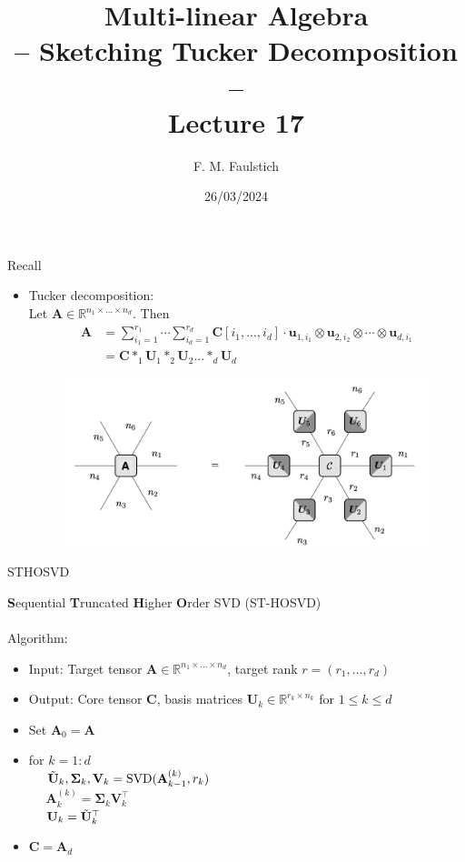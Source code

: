 \documentclass{beamer}
\title{
Multi-linear Algebra\\
-- Sketching Tucker Decomposition --\\
Lecture 17
}
\author{F. M. Faulstich}
\date{26/03/2024}
\newcommand{\bgk}[1]{\boldsymbol{#1}}
\newcommand{\bSigma}{\bgk{\Sigma}}
\newcommand{\bvec}[1]{\mathbf{#1}}
\newcommand{\vu}{\bvec{u}}
\newcommand{\vA}{\bvec{A}}
\newcommand{\vC}{\bvec{C}}
\newcommand{\vU}{\bvec{U}}
\newcommand{\vV}{\bvec{V}}
\newcommand{\bitem}{\item[$\bullet$]}
\begin{document}
\frame{\titlepage}

\begin{frame}{Recall}

\pause 

\begin{itemize}
    \bitem Tucker decomposition:\\
    \pause
    Let $\vA \in \mathbb{R}^{n_1\times ... \times n_d}$. Then
    $$
    \begin{aligned}
    \vA &=
    \sum_{i_1  = 1}^{r_1} \cdots \sum_{i_d  = 1}^{r_d}
\vC[i_1,...,i_d] \cdot \vu_{1,i_1}\otimes \vu_{2,i_2}\otimes \cdots \otimes \vu_{d,i_1}\\
    &= \vC *_{1} \vU_1 *_{2} \vU_2 ... *_{d} \vU_d
    \end{aligned}
    $$

\begin{figure}
    \centering
    \includegraphics[width=.8\textwidth]{Graphics/TuckerDecomp.png}
\end{figure}
    
\end{itemize}
    
\end{frame}

\begin{frame}{STHOSVD}

{\bf S}equential {\bf T}runcated {\bf H}igher {\bf O}rder SVD (ST-HOSVD)\\
~\\
Algorithm:
    \begin{itemize}
    \item[] Input: Target tensor $\vA\in\mathbb{R}^{n_1\times ... \times n_d}$, target rank $r = (r_1,...,r_d)$
    \item[] Output: Core tensor $\vC$, basis matrices $\vU_k\in \mathbb{R}^{r_k\times n_k}$ for $1\leq k \leq d$
    \item[] Set $\vA_0 = \vA$
    \item[] for $k=1:d$\\
    $\quad $ $\Tilde{\vU}_k, \bSigma_k, \vV_k = {\rm SVD}(\vA_{k-1}^{(k)}, r_k)$\\
    $\quad $ $\vA_k^{(k)} = \bSigma_k \vV_k^\top$\\
    $\quad $ $\vU_k = \Tilde{\vU}_k^\top $
    \item[] $\vC = \vA_d$
\end{itemize}

\end{frame}
\end{document}
